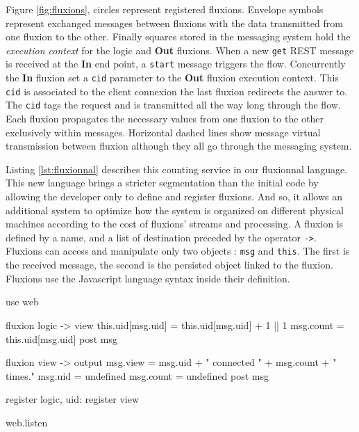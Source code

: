 Figure \ref{fig:fluxions}, circles represent registered fluxions.
Envelope symbols represent exchanged messages between fluxions with the data transmitted from one fluxion to the other. Finally squares stored in the messaging system hold the \textit{execution context} for the logic and \textbf{Out} fluxions.
When a new \texttt{get} REST message is received at the \textbf{In} end point, a \texttt{start} message triggers the flow.
Concurrently the \textbf{In} fluxion set a \texttt{cid} parameter to the \textbf{Out} fluxion execution context.
This \texttt{cid} is associated to the client connexion the last fluxion redirects the answer to.
The \texttt{cid} tags the request and is transmitted all the way long through the flow.
Each fluxion propagates the necessary values from one fluxion to the other exclusively within messages.
Horizontal dashed lines show message virtual transmission between fluxion although they all go through the messaging system.

Listing \ref{lst:fluxionnal} describes this counting service in our fluxionnal language.
This new language brings a stricter segmentation than the initial code by allowing the developer only to define and register fluxions.
And so, it allows an additional system to optimize how the system is organized on different physical machines according to the cost of fluxions' streams and processing.
A fluxion is defined by a name, and a list of destination preceded by the operator \texttt{-}\texttt{>}.
Fluxions can access and manipulate only two objects : \texttt{msg} and \texttt{this}.
The first is the received message, the second is the persisted object linked to the fluxion.
Fluxions use the Javascript language syntax inside their definition.


\begin{code}[Javascript, caption={Fluxionnal sample},label={lst:fluxionnal}]
use web

fluxion logic -> view
  this.uid[msg.uid] = this.uid[msg.uid] + 1 || 1
  msg.count = this.uid[msg.uid]
  post msg

fluxion view -> output
  msg.view = msg.uid + " connected " + msg.count + " times."
  msg.uid = undefined
  msg.count = undefined
  post msg

register logic, {uid: {}}
register view

web.listen
\end{code}

